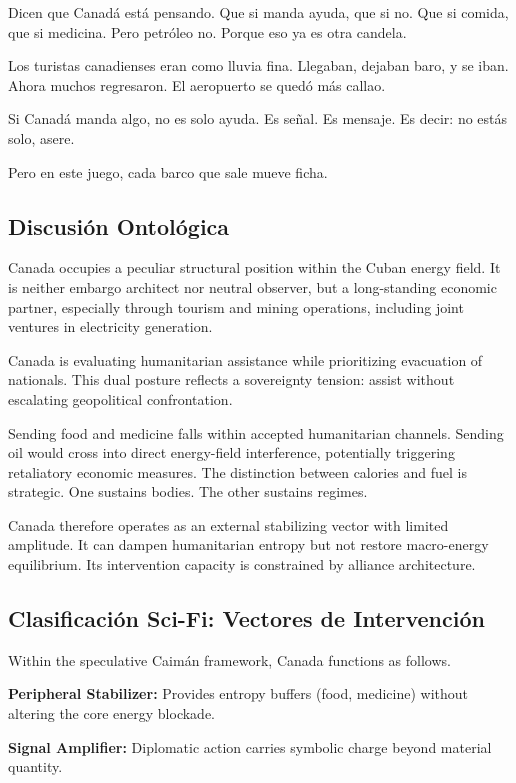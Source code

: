 \documentclass[12pt]{article}
\begin{document}
Dicen que Canadá está pensando. Que si manda ayuda, que si no. Que si comida, que si medicina. Pero petróleo no. Porque eso ya es otra candela.

Los turistas canadienses eran como lluvia fina. Llegaban, dejaban baro, y se iban. Ahora muchos regresaron. El aeropuerto se quedó más callao.

Si Canadá manda algo, no es solo ayuda. Es señal. Es mensaje. Es decir: no estás solo, asere.

Pero en este juego, cada barco que sale mueve ficha.

\subsection*{Discusión Ontológica}

Canada occupies a peculiar structural position within the Cuban energy field. It is neither embargo architect nor neutral observer, but a long-standing economic partner, especially through tourism and mining operations, including joint ventures in electricity generation.

Canada is evaluating humanitarian assistance while prioritizing evacuation of nationals. This dual posture reflects a sovereignty tension: assist without escalating geopolitical confrontation.

Sending food and medicine falls within accepted humanitarian channels. Sending oil would cross into direct energy-field interference, potentially triggering retaliatory economic measures. The distinction between calories and fuel is strategic. One sustains bodies. The other sustains regimes.

Canada therefore operates as an external stabilizing vector with limited amplitude. It can dampen humanitarian entropy but not restore macro-energy equilibrium. Its intervention capacity is constrained by alliance architecture.

\subsection*{Clasificación Sci-Fi: Vectores de Intervención}

Within the speculative Caimán framework, Canada functions as follows.

\textbf{Peripheral Stabilizer:} Provides entropy buffers (food, medicine) without altering the core energy blockade.

\textbf{Signal Amplifier:} Diplomatic action carries symbolic charge beyond material quantity.
\end{document}
